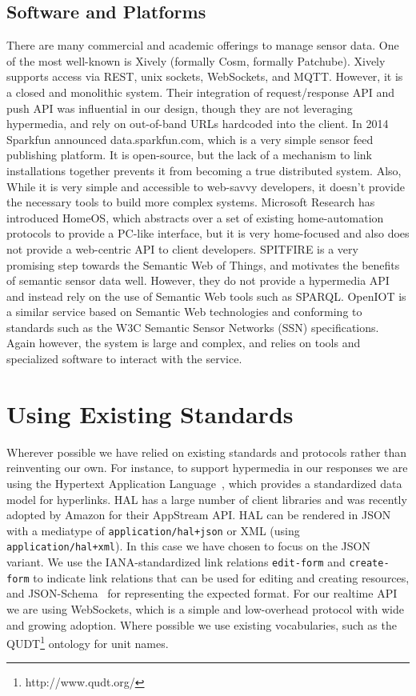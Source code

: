 \documentclass{acm_proc_article-sp}
\begin{document}
\subsection{Software and Platforms}
There are many commercial and academic offerings to manage sensor data. One of
the most well-known is Xively (formally Cosm, formally Patchube). Xively
supports access via REST, unix sockets, WebSockets, and MQTT. However, it is a
closed and monolithic system. Their integration of request/response API and
push API was influential in our design, though they are not leveraging
hypermedia, and rely on out-of-band URLs hardcoded into the client. In 2014
Sparkfun announced data.sparkfun.com, which is a very simple sensor feed
publishing platform. It is open-source, but the lack of a mechanism to link
installations together prevents it from becoming a true distributed system.
Also, While it is very simple and accessible to web-savvy developers, it
doesn't provide the necessary tools to build more complex systems. Microsoft
Research has introduced HomeOS\cite{homeos}, which abstracts over a set of
existing home-automation protocols to provide a PC-like interface, but it is
very home-focused and also does not provide a web-centric API to client
developers. SPITFIRE\cite{spitfire} is a very promising step towards the
Semantic Web of Things, and motivates the benefits of semantic sensor data well.
However, they do not provide a hypermedia API and instead rely on the use
of Semantic Web tools such as SPARQL. OpenIOT\cite{openiot} is a similar
service based on Semantic Web technologies and conforming to standards such as
the W3C Semantic Sensor Networks (SSN) specifications. Again however, the
system is large and complex, and relies on tools and specialized software to
interact with the service.

\section{Using Existing Standards}

Wherever possible we have relied on existing standards and protocols rather
than reinventing our own. For instance, to support hypermedia in our responses
we are using the Hypertext Application Language~\cite{json-hal-draft}, which
provides a standardized data model for hyperlinks. HAL has a large number of
client libraries and was recently adopted by Amazon for their AppStream API.
HAL can be rendered in JSON with a mediatype of \texttt{application/hal+json}
or XML (using \mbox{\texttt{application/hal+xml}}). In this case we have chosen to focus on
the JSON variant. We use the IANA-standardized link relations
\texttt{edit-form} and \texttt{create-form} to indicate link relations that can
be used for editing and creating resources, and
JSON-Schema~\cite{json-schema-draft} for representing the expected format. For
our realtime API we are using WebSockets, which is a simple and low-overhead
protocol with wide and growing adoption. Where possible we use existing
vocabularies, such as the QUDT\footnote{http://www.qudt.org/} ontology for unit
names.
\end{document}
